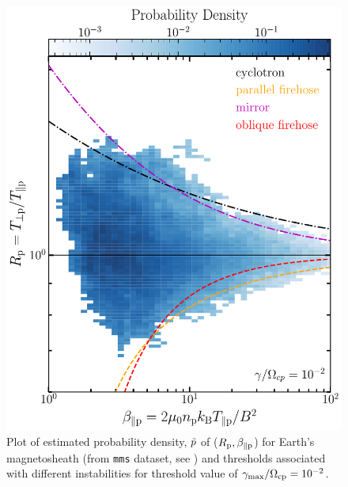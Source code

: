         \begin{figure}
            \begin{center}
                \includegraphics[width=1\textwidth]{figures/chap2/brazil_prob_mms.pdf}
                \caption[Brazil-plot in magnetosheath]{Plot of estimated probability density,
                $\Tilde{p}$ of ($R_{\rm p}, \beta_{\parallel \rm p}$) for Earth's magnetosheath
                (from \texttt{mms} dataset, see ) and thresholds associated with
                different instabilities for threshold value of $\gamma_{\max}/\Omega_{\rm cp} =
                10^{-2}$.}
                \label{fig:brazil_prob_mms}
            \end{center}
        \end{figure}

